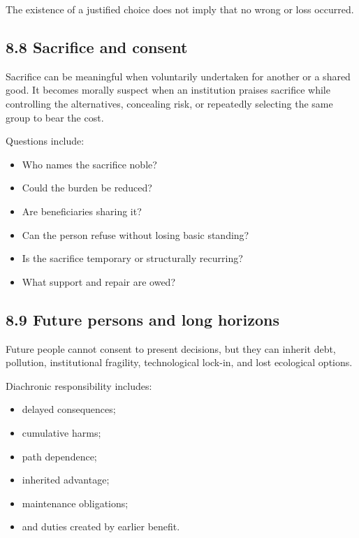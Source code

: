 \documentclass[
  11pt,
]{article}
\providecommand{\tightlist}{%
  \setlength{\itemsep}{0pt}\setlength{\parskip}{0pt}}
\begin{document}
The existence of a justified choice does not imply that no wrong or loss
occurred.

\subsection{8.8 Sacrifice and consent}\label{sacrifice-and-consent}

Sacrifice can be meaningful when voluntarily undertaken for another or a
shared good. It becomes morally suspect when an institution praises
sacrifice while controlling the alternatives, concealing risk, or
repeatedly selecting the same group to bear the cost.

Questions include:

\begin{itemize}
\tightlist
\item
  Who names the sacrifice noble?
\item
  Could the burden be reduced?
\item
  Are beneficiaries sharing it?
\item
  Can the person refuse without losing basic standing?
\item
  Is the sacrifice temporary or structurally recurring?
\item
  What support and repair are owed?
\end{itemize}

\subsection{8.9 Future persons and long
horizons}\label{future-persons-and-long-horizons}

Future people cannot consent to present decisions, but they can inherit
debt, pollution, institutional fragility, technological lock-in, and
lost ecological options.

Diachronic responsibility includes:

\begin{itemize}
\tightlist
\item
  delayed consequences;
\item
  cumulative harms;
\item
  path dependence;
\item
  inherited advantage;
\item
  maintenance obligations;
\item
  and duties created by earlier benefit.
\end{itemize}
\end{document}
